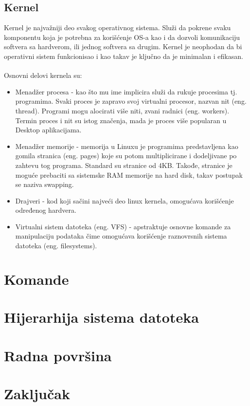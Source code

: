 \documentclass[a4paper,14pt]{article}
\begin{document}
\subsection{Kernel}
Kernel je najvažniji deo svakog operativnog sistema. Služi da pokrene svaku komponentu koja je potrebna za korišćenje OS-a kao i da dozvoli komunikaciju softvera sa hardverom, ili jednog softvera sa drugim. Kernel je neophodan da bi operativni sistem funkcionisao i kao takav je ključno da je minimalan i efikasan.
\\\\
Osnovni delovi kernela su:
\begin{itemize}
\item Menadžer procesa - kao što mu ime implicira služi da rukuje procesima tj. programima. Svaki proces je zapravo svoj virtualni procesor, nazvan nit (eng. thread). Programi mogu alocirati više niti, zvani radnici (eng. workers). Termin proces i nit su istog značenja, mada je proces više popularan u Desktop aplikacijama.
\item Menadžer memorije - memorija u Linuxu je programima predstavljena kao gomila stranica (eng. pages) koje su potom multiplicirane i dodeljivane po zahtevu tog programa. Standard su stranice od 4KB. Takođe, stranice je moguće prebaciti sa sistemske RAM memorije na hard disk, takav postupak se naziva swapping.
\item Drajveri - kod koji sačini najveći deo linux kernela, omogućava korišćenje određenog hardvera.
\item Virtualni sistem datoteka (eng. VFS) - apstraktuje osnovne komande za manipulaciju podataka čime omogućava korišćenje raznovrsnih sistema datoteka (eng. filesystems).
\end{itemize}
\newpage

\section{Komande}
\newpage

\section{Hijerarhija sistema datoteka}
\newpage

\section{Radna površina}
\newpage

\section{Zaključak}
\newpage
\end{document}
